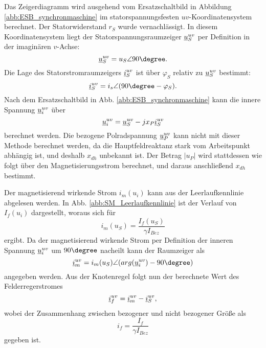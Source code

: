 \noindent Das Zeigerdiagramm wird ausgehend vom Ersatzschaltbild in Abbildung \ref{abb:ESB_synchronmaschine} im statorspannungsfesten $uv$-Koordinatensystem berechnet. Der Statorwiderstand $r_S$ wurde vernachlässigt. In diesem Koordinatensystem liegt der Statorspannungsraumzeiger $\underline{u}^{uv}_S$ per Definition in der imaginären $v$-Achse:
\begin{equation*}
    \zuv{u}_S = u_S \angle 90\degree.
\end{equation*}
Die Lage des Statorstromraumzeigers $\underline{i}^{uv}_S$ ist über $\varphi_S$ relativ zu $\underline{u}^{uv}_S$ bestimmt:
\begin{equation*}
    \zuv{i}_S=i_s \angle (90\degree-\varphi_S).
\end{equation*}
Nach dem Ersatzschaltbild in Abb. \ref{abb:ESB_synchronmaschine} kann die innere Spannung $\underline{u}^{uv}_i$ über
\begin{equation*}
    \underline{u}^{uv}_i=\underline{u}^{uv}_S-j x_P \underline{i}^{uv}_S
\end{equation*}
berechnet werden. Die bezogene Polradspannung $\underline{u}^{uv}_P$ kann nicht mit dieser Methode berechnet werden, da die Hauptfeldreaktanz stark vom Arbeitspunkt abhängig ist, und deshalb $x_{dh}$ unbekannt ist. Der Betrag $|u_P|$ wird stattdessen wie folgt über den Magnetisierungsstrom berechnet, und daraus anschließend $x_{dh}$ bestimmt.

\noindent Der magnetisierend wirkende Strom $i_m(u_i)$ kann aus der Leerlaufkennlinie abgelesen werden. In Abb. \ref{abb:SM_Leerlaufkennlinie} ist der Verlauf von $I_f(u_i)$ dargestellt, woraus sich für
\begin{equation*}
    i_m(u_S)=\frac{I_f(u_S)}{\gamma I_{Bez}}
\end{equation*}
ergibt. Da der magnetisierend wirkende Strom per Definition der inneren Spannung $\underline{u}^{uv}_i$ um $90\degree$ nacheilt kann der Raumzeiger als
\begin{equation*}
    \zuv{i}_m=i_m(u_S) \angle (arg(\zuv{u}_i)-90\degree)
\end{equation*}
angegeben werden. Aus der Knotenregel folgt nun der berechnete Wert des Felderregerstromes
\begin{equation*}
    \underline{i}^{uv}_f=\underline{i}^{uv}_m-\underline{i}^{uv}_S, 
\end{equation*}
wobei der Zusammenhang zwischen bezogener und nicht bezogener Größe als
\begin{equation*}
    i_f=\frac{I_f}{\gamma I_{Bez}}
\end{equation*}
gegeben ist.

